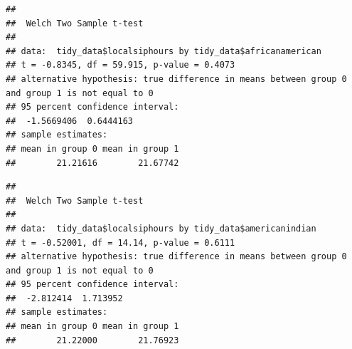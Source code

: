 \documentclass[
  11 pt,
]{article}
\newenvironment{Shaded}{\begin{snugshade}}{\end{snugshade}}
\newcommand{\AttributeTok}[1]{\textcolor[rgb]{0.77,0.63,0.00}{#1}}
\newcommand{\ConstantTok}[1]{\textcolor[rgb]{0.00,0.00,0.00}{#1}}
\newcommand{\FunctionTok}[1]{\textcolor[rgb]{0.00,0.00,0.00}{#1}}
\newcommand{\NormalTok}[1]{#1}
\newcommand{\SpecialCharTok}[1]{\textcolor[rgb]{0.00,0.00,0.00}{#1}}
\begin{document}
\begin{Shaded}
\end{Shaded}

\begin{verbatim}
## 
##  Welch Two Sample t-test
## 
## data:  tidy_data$localsiphours by tidy_data$africanamerican
## t = -0.8345, df = 59.915, p-value = 0.4073
## alternative hypothesis: true difference in means between group 0 and group 1 is not equal to 0
## 95 percent confidence interval:
##  -1.5669406  0.6444163
## sample estimates:
## mean in group 0 mean in group 1 
##        21.21616        21.67742
\end{verbatim}

\begin{Shaded}
\end{Shaded}

\begin{verbatim}
## 
##  Welch Two Sample t-test
## 
## data:  tidy_data$localsiphours by tidy_data$americanindian
## t = -0.52001, df = 14.14, p-value = 0.6111
## alternative hypothesis: true difference in means between group 0 and group 1 is not equal to 0
## 95 percent confidence interval:
##  -2.812414  1.713952
## sample estimates:
## mean in group 0 mean in group 1 
##        21.22000        21.76923
\end{verbatim}

\begin{Shaded}
\end{Shaded}
\end{document}
